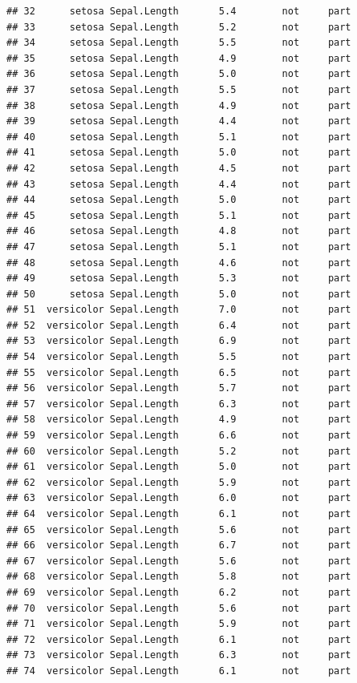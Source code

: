 \documentclass[krantz2]{krantz}\usepackage{knitr}%
\begin{document}
\begin{knitrout}
\begin{kframe}
\begin{verbatim}
## 32      setosa Sepal.Length       5.4        not     part
## 33      setosa Sepal.Length       5.2        not     part
## 34      setosa Sepal.Length       5.5        not     part
## 35      setosa Sepal.Length       4.9        not     part
## 36      setosa Sepal.Length       5.0        not     part
## 37      setosa Sepal.Length       5.5        not     part
## 38      setosa Sepal.Length       4.9        not     part
## 39      setosa Sepal.Length       4.4        not     part
## 40      setosa Sepal.Length       5.1        not     part
## 41      setosa Sepal.Length       5.0        not     part
## 42      setosa Sepal.Length       4.5        not     part
## 43      setosa Sepal.Length       4.4        not     part
## 44      setosa Sepal.Length       5.0        not     part
## 45      setosa Sepal.Length       5.1        not     part
## 46      setosa Sepal.Length       4.8        not     part
## 47      setosa Sepal.Length       5.1        not     part
## 48      setosa Sepal.Length       4.6        not     part
## 49      setosa Sepal.Length       5.3        not     part
## 50      setosa Sepal.Length       5.0        not     part
## 51  versicolor Sepal.Length       7.0        not     part
## 52  versicolor Sepal.Length       6.4        not     part
## 53  versicolor Sepal.Length       6.9        not     part
## 54  versicolor Sepal.Length       5.5        not     part
## 55  versicolor Sepal.Length       6.5        not     part
## 56  versicolor Sepal.Length       5.7        not     part
## 57  versicolor Sepal.Length       6.3        not     part
## 58  versicolor Sepal.Length       4.9        not     part
## 59  versicolor Sepal.Length       6.6        not     part
## 60  versicolor Sepal.Length       5.2        not     part
## 61  versicolor Sepal.Length       5.0        not     part
## 62  versicolor Sepal.Length       5.9        not     part
## 63  versicolor Sepal.Length       6.0        not     part
## 64  versicolor Sepal.Length       6.1        not     part
## 65  versicolor Sepal.Length       5.6        not     part
## 66  versicolor Sepal.Length       6.7        not     part
## 67  versicolor Sepal.Length       5.6        not     part
## 68  versicolor Sepal.Length       5.8        not     part
## 69  versicolor Sepal.Length       6.2        not     part
## 70  versicolor Sepal.Length       5.6        not     part
## 71  versicolor Sepal.Length       5.9        not     part
## 72  versicolor Sepal.Length       6.1        not     part
## 73  versicolor Sepal.Length       6.3        not     part
## 74  versicolor Sepal.Length       6.1        not     part

\end{verbatim}
\end{kframe}
\end{knitrout}
\end{document}
